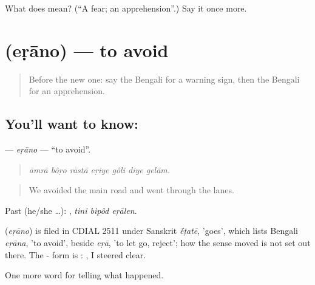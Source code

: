 \begin{tcolorbox}[breakable,colback=teal!4,colframe=teal!35!black,title={Before you move on}]
What does  mean? (\textquotedblleft{}A fear; an apprehension\textquotedblright{}.) Say it once more.
\end{tcolorbox}
\section[\texorpdfstring{\bn{এড়ানো} (eṛāno)}{এড়ানো (eṛāno)}]{ (eṛāno) — to avoid}

\label{lesson:BN-C294-erano}



\begin{quote}
Before the new one: say the Bengali for a warning sign, then the Bengali for an apprehension.
\end{quote}

\subsection*{You'll want to know: }
\textbf{} — \emph{eṛāno} — \textquotedblleft{}to avoid\textquotedblright{}.

\begin{quote}
      
\end{quote}

\begin{quote}
\emph{āmrā bôṛo rāstā eṛiye gôli diye gelām.}
\end{quote}

\begin{quote}
We avoided the main road and went through the lanes.
\end{quote}

Past (he/she …):   , \emph{tini bipôd eṛālen}.

\begin{cousinweb}
\textbf{} (\emph{eṛāno}) is filed in CDIAL 2511 under Sanskrit \emph{\'{\={e}}ṭatē}, 'goes', which lists Bengali \emph{eṛāna}, 'to avoid', beside \emph{eṛā}, 'to let go, reject'; how the sense moved is not set out there. The - form is :  , I steered clear.
\end{cousinweb}

\begin{grammarlens}[title={What you've built}]
One more word for telling what happened.
\end{grammarlens}

